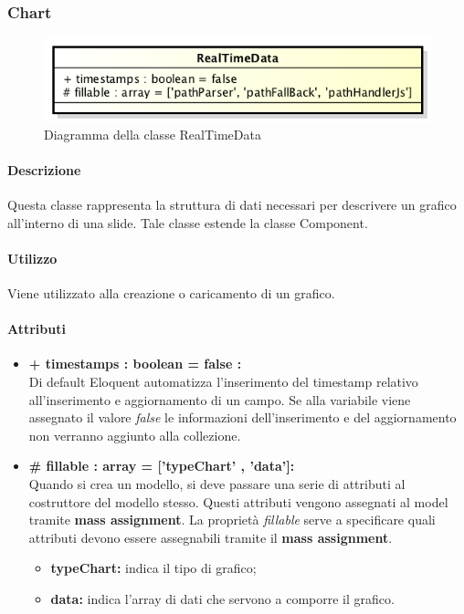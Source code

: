 \subsubsection{Chart}

	\begin{figure}[h]
		\centering
		\includegraphics[width=0.5\linewidth]{img/back_end_premi_model_realTimeData}
		\caption[Diagramma della classe RealTimeData]{Diagramma della classe RealTimeData}
		\label{fig:back_end_premi_model_chart}
	\end{figure}

	\paragraph{Descrizione}
	Questa classe rappresenta la struttura di dati necessari per descrivere un grafico all'interno di una slide. Tale classe estende la classe Component.
	
	\paragraph{Utilizzo}
	Viene utilizzato alla creazione o caricamento di un grafico.

	\paragraph{Attributi}
	\begin{itemize}
		\item \textbf{+ timestamps : boolean = false :}\\
		Di default Eloquent automatizza l'inserimento del timestamp relativo all'inserimento e aggiornamento di un campo. Se alla variabile viene assegnato il valore \textit{false} le informazioni dell'inserimento e del aggiornamento non verranno aggiunto alla collezione.
		\item \textbf{\# fillable : array = [’typeChart’ , ’data’]:}\\
		Quando si crea un modello, si deve passare una serie di attributi al costruttore del modello stesso. Questi attributi vengono assegnati al model tramite \textbf{mass assignment}. La proprietà \textit{fillable} serve a specificare quali attributi devono essere assegnabili tramite il \textbf{mass assignment}.
		\begin{itemize}
			\item \textbf{typeChart:} indica il tipo di grafico;
			\item \textbf{data:} indica l'array di dati che servono a comporre il grafico.
		\end{itemize}
		
	\end{itemize}
\newpage



